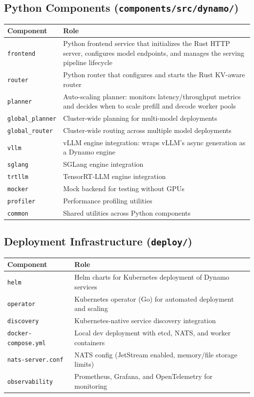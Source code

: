 \subsection{Python Components (\texttt{components/src/dynamo/})}

\begin{center}
\small
\begin{tabular}{p{3.2cm}p{9cm}}
\toprule
\textbf{Component} & \textbf{Role} \\
\midrule
\texttt{frontend} & Python frontend service that initializes the Rust HTTP server, configures model endpoints, and manages the serving pipeline lifecycle \\
\texttt{router} & Python router that configures and starts the Rust KV-aware router \\
\texttt{planner} & Auto-scaling planner: monitors latency/throughput metrics and decides when to scale prefill and decode worker pools \\
\texttt{global\_planner} & Cluster-wide planning for multi-model deployments \\
\texttt{global\_router} & Cluster-wide routing across multiple model deployments \\
\texttt{vllm} & vLLM engine integration: wraps vLLM's async generation as a Dynamo engine \\
\texttt{sglang} & SGLang engine integration \\
\texttt{trtllm} & TensorRT-LLM engine integration \\
\texttt{mocker} & Mock backend for testing without GPUs \\
\texttt{profiler} & Performance profiling utilities \\
\texttt{common} & Shared utilities across Python components \\
\bottomrule
\end{tabular}
\end{center}

\subsection{Deployment Infrastructure (\texttt{deploy/})}

\begin{center}
\small
\begin{tabular}{p{3.2cm}p{9cm}}
\toprule
\textbf{Component} & \textbf{Role} \\
\midrule
\texttt{helm} & Helm charts for Kubernetes deployment of Dynamo services \\
\texttt{operator} & Kubernetes operator (Go) for automated deployment and scaling \\
\texttt{discovery} & Kubernetes-native service discovery integration \\
\texttt{docker-compose.yml} & Local dev deployment with etcd, NATS, and worker containers \\
\texttt{nats-server.conf} & NATS config (JetStream enabled, memory/file storage limits) \\
\texttt{observability} & Prometheus, Grafana, and OpenTelemetry for monitoring \\
\bottomrule
\end{tabular}
\end{center}

